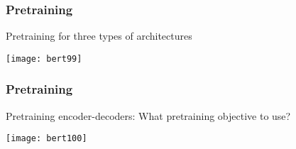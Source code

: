



\begin{frame}[fragile]\frametitle{Pretraining}

			Pretraining for three types of architectures
			
			\begin{center}
			\texttt{[image: bert99]}
			\end{center}		
			

\end{frame}

\begin{frame}[fragile]\frametitle{Pretraining}

			Pretraining encoder-decoders: What pretraining objective to use?
			
			\begin{center}
			\texttt{[image: bert100]}
			\end{center}		
			

\end{frame}

